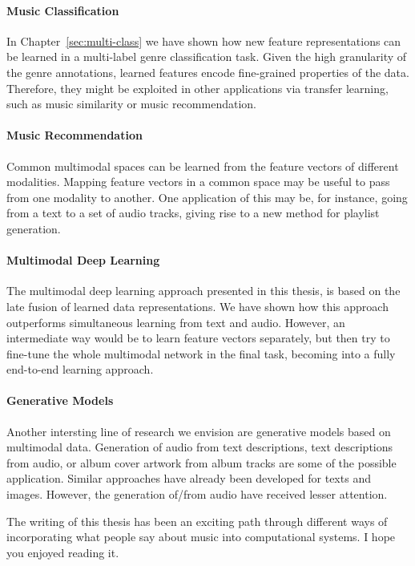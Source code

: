 \paragraph{Music Classification} In Chapter~\ref{sec:multi-class} we have shown how new feature representations can be learned in a multi-label genre classification task. Given the high granularity of the genre annotations, learned features encode fine-grained properties of the data. Therefore, they might be exploited in other applications via transfer learning, such as music similarity or music recommendation. 

\paragraph{Music Recommendation} Common multimodal spaces can be learned from the feature vectors of different modalities. Mapping feature vectors in a common space may be useful to pass from one modality to another. One application of this may be, for instance, going from a text to a set of audio tracks, giving rise to a new method for playlist generation.

\paragraph{Multimodal Deep Learning}
The multimodal deep learning approach presented in this thesis, is based on the late fusion of learned data representations. We have shown how this approach outperforms simultaneous learning from text and audio. However, an intermediate way would be to learn feature vectors separately, but then try to fine-tune the whole multimodal network in the final task, becoming into a fully end-to-end learning approach.

\paragraph{Generative Models} Another intersting line of research we envision are generative models based on multimodal data. Generation of audio from text descriptions, text descriptions from audio, or album cover artwork from album tracks are some of the possible application. Similar approaches have already been developed for texts and images. However, the generation of/from audio have received lesser attention.

The writing of this thesis has been an exciting path through different ways of incorporating what people say about music into computational systems. I hope you enjoyed reading it.